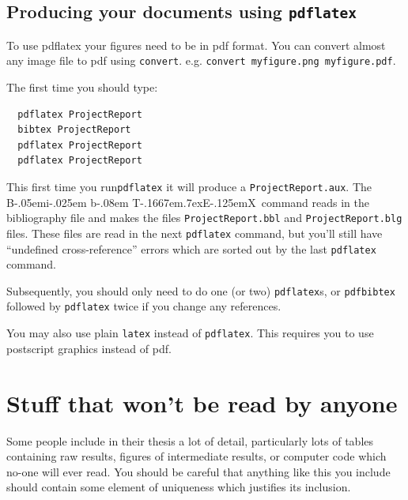 \documentclass[12pt,a4paper]{report}
\def\BibTeX{{\rm B\kern-.05em{\sc i\kern-.025em b}\kern-.08em
    T\kern-.1667em\lower.7ex\hbox{E}\kern-.125emX}}
\begin{document}
\section{Producing your documents using \texttt{pdflatex}}

To use pdflatex your figures need to be in pdf format.  You can convert almost any image file to pdf using \texttt{convert}.  e.g. \texttt{convert myfigure.png myfigure.pdf}.

The first time you should type:
\begin{verbatim}
  pdflatex ProjectReport
  bibtex ProjectReport
  pdflatex ProjectReport
  pdflatex ProjectReport
\end{verbatim} 
This first time you run\texttt{pdflatex} it will produce a
\texttt{ProjectReport.aux}.  The \BibTeX\ command reads in the
bibliography file and makes the files \texttt{ProjectReport.bbl} and
\texttt{ProjectReport.blg} files.  These files are read in the next
\texttt{pdflatex} command, but you'll still have ``undefined
cross-reference'' errors which are sorted out by the last
\texttt{pdflatex} command.

Subsequently, you should only need to do one (or two)
\texttt{pdflatex}s, or \texttt{pdfbibtex} followed by
\texttt{pdflatex} twice if you change any references.

\vspace{5mm} You may also use plain \texttt{latex} instead of
\texttt{pdflatex}.  This requires you to use postscript graphics
instead of pdf.




\chapter{Stuff that won't be read by anyone}

Some people include in their thesis a lot of detail, particularly lots
of tables containing raw results, figures of intermediate results, or
computer code which no-one will ever read. You should be careful that
anything like this you include should contain some element of
uniqueness which justifies its inclusion.


\newpage



\end{document}
